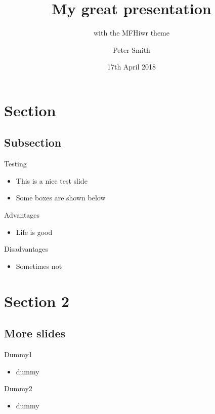 \documentclass{MFHpresentation}
\title{My great presentation}
\subtitle{with the MFHiwr theme}
\author{Peter Smith}
\institute{
	FURBY institute
}
\date[17.04.18]{17th April 2018}
\begin{document}
\titlepage
\tocframe

\section{Section}
\subsection{Subsection}
\begin{frame}{Testing}
	\begin{itemize}
		\item This is a nice \alert{test slide}
		\item Some boxes are shown below
	\end{itemize}

	\begin{block}{\textcolor{IwrGreen}{Advantages}}
		\begin{itemize}
			\item Life is good
		\end{itemize}
	\end{block}

	\begin{alertblock}{Disadvantages}
		\begin{itemize}
			\item Sometimes not
		\end{itemize}
	\end{alertblock}
\end{frame}

\section{Section 2}
\subsection{More slides}

\begin{frame}{Dummy1}
	\begin{itemize}
		\item dummy
	\end{itemize}
\end{frame}

\begin{frame}{Dummy2}
	\begin{itemize}
		\item dummy
	\end{itemize}
\end{frame}
\end{document}
